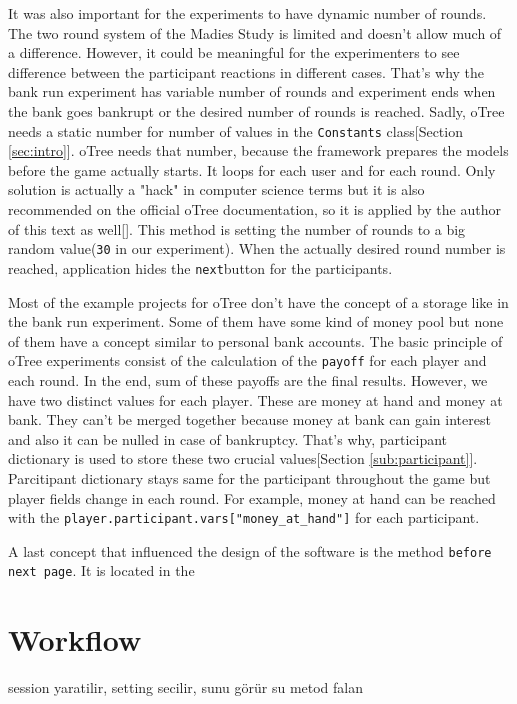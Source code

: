 It was also important for the experiments to have dynamic number of rounds. The two round system of the Madies Study is limited and doesn't allow much of a difference. However, it could be meaningful for the experimenters to see difference between the participant reactions in different cases. That's why the bank run experiment has variable number of rounds and experiment ends when the bank goes bankrupt or the desired number of rounds is reached. Sadly, oTree needs a static number for number of values in the \verb|Constants| class[Section \ref{sec:intro}]. oTree needs that number, because the framework prepares the models before the game actually starts. It loops for each user and for each round. Only solution is actually a "hack" in computer science terms but it is also recommended on the official oTree documentation, so it is applied by the author of this text as well[\cite{oTreeModel2017}]. This method is setting the number of rounds to a big random value(\verb|30| in our experiment). When the actually desired round number is reached, application hides the \verb|next|button for the participants.

Most of the example projects for oTree don't have the concept of a storage like in the bank run experiment. Some of them have some kind of money pool but none of them have a concept similar to personal bank accounts. The basic principle of oTree experiments consist of the calculation of the \verb|payoff| for each player and each round. In the end, sum of these payoffs are the final results. However, we have two distinct values for each player. These are money at hand and money at bank. They can't be merged together because money at bank can gain interest and also it can be nulled in case of bankruptcy. That's why, participant dictionary is used to store these two crucial values[Section \ref{sub:participant}]. Parcitipant dictionary stays same for the participant throughout the game but player fields change in each round. For example, money at hand can be reached with the \verb|player.participant.vars["money_at_hand"]| for each participant.

A last concept that influenced the design of the software is the method \verb|before next page|. It is located in the 

\section{Workflow}

session yaratilir, setting secilir, sunu görür su metod falan




